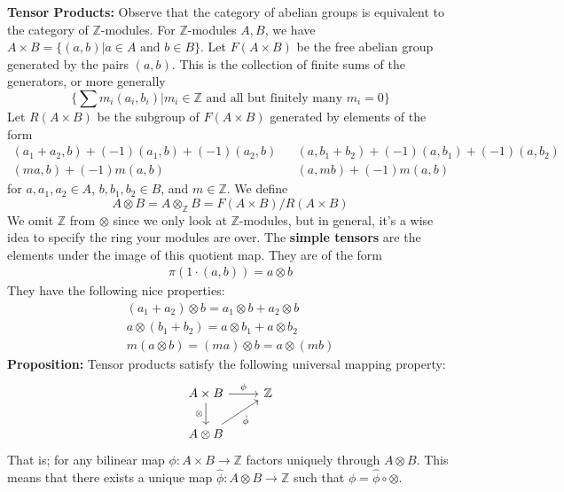 \documentclass{article}
\begin{document}
\textbf{Tensor Products:} Observe that the category of abelian groups is equivalent to the category of $\mathbb{Z}$-modules. For $\mathbb{Z}$-modules $A,B$, we have $A \times B = \{ (a,b) | a \in A \text{ and } b \in B \}$. Let $F(A \times B)$ be the free abelian group generated by the pairs $(a,b)$. This is the collection of finite sums of the generators, or more generally
\[
\{ \sum m_i (a_i,b_i) | m_i \in \mathbb{Z} \text{ and all but finitely many } m_i = 0 \}
\]
Let $R(A \times B)$ be the subgroup of $F(A \times B)$ generated by elements of the form
\begin{align*}
(a_1 + a_2, b) + (-1)(a_1, b) + (-1)(a_2, b) & & (a, b_1 + b_2) + (-1)(a,b_1) + (-1)(a,b_2) \\
(ma,b) + (-1)m(a,b)& & (a,mb) + (-1)m(a,b) 
\end{align*}
for $a, a_1, a_2 \in A$, $b, b_1, b_2 \in B$, and $m \in \mathbb{Z}$. We define
\[
A \otimes B = A \otimes_\mathbb{Z} B = F(A \times B) / R(A \times B)
\]
We omit $\mathbb{Z}$ from $\otimes$ since we only look at $\mathbb{Z}$-modules, but in general, it's a wise idea to specify the ring your modules are over. The \textbf{simple tensors} are the elements under the image of this quotient map. They are of the form
\begin{align*}
\pi(1\cdot (a,b)) = a \otimes b
\end{align*}
They have the following nice properties:
\begin{align*}
(a_1 + a_2)\otimes b = a_1 \otimes b + a_2 \otimes b \\
a\otimes (b_1 + b_2) = a \otimes b_1 + a \otimes b_2 \\
m(a \otimes b) = (ma)\otimes b = a \otimes (mb)
\end{align*}
\textbf{Proposition:} Tensor products satisfy the following universal mapping property:
\[
\begin{tikzcd}
A \times B \arrow[r, "\phi"] \arrow[d, "\otimes"'] & \mathbb{Z} \\
A \otimes B \arrow[ru, "\hat{\phi}"']
\end{tikzcd}
\]
That is; for any bilinear map $\phi: A \times B \to \mathbb{Z}$ factors uniquely through $A \otimes B$. This means that there exists a unique map $\hat{\phi}: A \otimes B \to \mathbb{Z}$ such that $\phi = \hat{\phi} \circ \otimes$.
\end{document}
